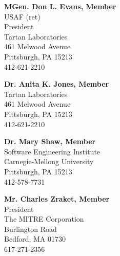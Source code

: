 \documentclass[12pt,final]{article}
\begin{document}
\medskip

\textbf{MGen. Don L. Evans, Member}\\
\hspace*{2cm}USAF (ret)\\
\hspace*{2cm}President\\
\hspace*{2cm}Tartan Laboratories\\
\hspace*{2cm}461 Melwood Avenue\\
\hspace*{2cm}Pittsburgh, PA 15213\\
\hspace*{2cm}412-621-2210

\medskip

\textbf{Dr. Anita K. Jones, Member}\\
\hspace*{2cm}Tartan Laboratories\\
\hspace*{2cm}461 Melwood Avenue\\
\hspace*{2cm}Pittsburgh, PA 15213\\
\hspace*{2cm}412-621-2210

\medskip

\textbf{Dr. Mary Shaw, Member}\\
\hspace*{2cm}Software Engineering Institute\\
\hspace*{2cm}Carnegie-Mellong University\\
\hspace*{2cm}Pittsburgh, PA 15213\\
\hspace*{2cm}412-578-7731

\medskip

\textbf{Mr. Charles Zraket, Member}\\
\hspace*{2cm}President\\
\hspace*{2cm}The MITRE Corporation\\
\hspace*{2cm}Burlington Road\\
\hspace*{2cm}Bedford, MA 01730\\
\hspace*{2cm}617-271-2356
\end{document}
